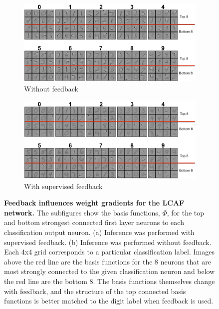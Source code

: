 \begin{figure}
    \centering
    \begin{subfigure}[b]{0.9\textwidth}
        \centering
        \includegraphics[width=\textwidth]{figures/lca_nofeedback_classifier_features.png}
        \caption{Without feedback}
        \label{fig:ch3_nofeedback_features}
    \end{subfigure}
    \begin{subfigure}[b]{0.9\textwidth}
        \centering
        \includegraphics[width=\textwidth]{figures/lca_feedback_classifier_features.png}
        \caption{With supervised feedback}
        \label{fig:ch3_feedback_features}
    \end{subfigure}
    \caption{\textbf{Feedback influences weight gradients for the LCAF network.} The subfigures show the basis functions, $\Phi$, for the top and bottom strongest connected first layer neurons to each classification output neuron. (a) Inference was performed with supervised feedback. (b) Inference was performed without feedback. Each 4x4 grid corresponds to a particular classification label. Images above the red line are the basis functions for the 8 neurons that are most strongly connected to the given classification neuron and below the red line are the bottom 8. The basis functions themselves change with feedback, and the structure of the top connected basis functions is better matched to the digit label when feedback is used.}
    \label{fig:ch3_feedback_nofeedback_features}
\end{figure}


